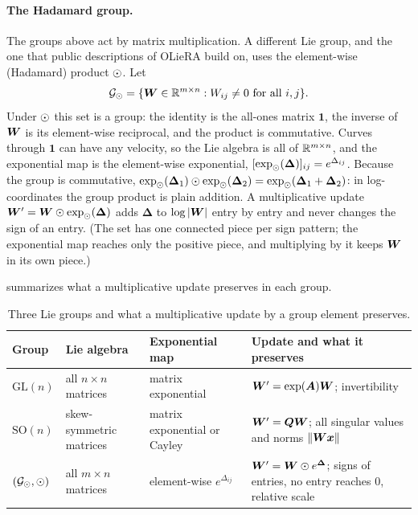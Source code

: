 \paragraph{The Hadamard group.} The groups above act by matrix multiplication. A different Lie
group, and the one that public descriptions of OLieRA build on, uses the element-wise (Hadamard)
product $\odot$. Let
\begin{equation}
  \mathcal{G}_{\odot} = \{\bm{W} \in \mathbb{R}^{m\times n} : W_{ij} \ne 0 \text{ for all } i,j\}.
  \label{eq:c11-hadamard-group}
\end{equation}
Under $\odot$ this set is a group: the identity is the all-ones matrix $\bm{1}$, the inverse of
$\bm{W}$ is its element-wise reciprocal, and the product is commutative. Curves through $\bm{1}$ can
have any velocity, so the Lie algebra is all of $\mathbb{R}^{m\times n}$, and the exponential map is the
element-wise exponential, $[\exp_{\odot}(\bm{\Delta})]_{ij} = e^{\Delta_{ij}}$. Because the group is
commutative, $\exp_{\odot}(\bm{\Delta}_1)\odot\exp_{\odot}(\bm{\Delta}_2) = \exp_{\odot}(\bm{\Delta}_1 +
\bm{\Delta}_2)$: in log-coordinates the group product is plain addition. A multiplicative update
$\bm{W}' = \bm{W}\odot\exp_{\odot}(\bm{\Delta})$ adds $\bm{\Delta}$ to $\log\left\lvert \bm{W}\right\rvert$ entry by entry and never
changes the sign of an entry. (The set has one connected piece per sign pattern; the exponential
map reaches only the positive piece, and multiplying by it keeps $\bm{W}$ in its own piece.)

 summarizes what a multiplicative update preserves in each group.

\begin{table}[t]
\centering\small
\caption{Three Lie groups and what a multiplicative update by a group element preserves.}
\label{tab:c11-groups}
\begin{tabularx}{\textwidth}{@{}ll>{\raggedright\arraybackslash}X>{\raggedright\arraybackslash}X@{}}
\toprule
Group & Lie algebra & Exponential map & Update and what it preserves \\
\midrule
$\mathrm{GL}(n)$ & all $n\times n$ matrices & matrix exponential & $\bm{W}' = \exp(\bm{A})\bm{W}$; invertibility \\
$\mathrm{SO}(n)$ & skew-symmetric matrices & matrix exponential or Cayley & $\bm{W}' = \bm{Q}\bm{W}$; all singular values and norms $\left\lVert \bm{W}\bm{x}\right\rVert$ \\
$(\mathcal{G}_{\odot}, \odot)$ & all $m\times n$ matrices & element-wise $e^{\Delta_{ij}}$ & $\bm{W}' = \bm{W}\odot e^{\bm{\Delta}}$; signs of entries, no entry reaches $0$, relative scale \\
\bottomrule
\end{tabularx}
\end{table}

